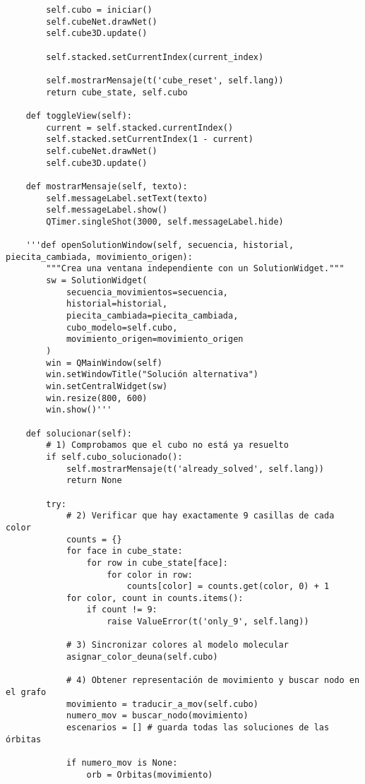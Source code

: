 \begin{lstlisting}
        self.cubo = iniciar()
        self.cubeNet.drawNet()
        self.cube3D.update()
        
        self.stacked.setCurrentIndex(current_index) 

        self.mostrarMensaje(t('cube_reset', self.lang))
        return cube_state, self.cubo

    def toggleView(self):
        current = self.stacked.currentIndex()
        self.stacked.setCurrentIndex(1 - current)
        self.cubeNet.drawNet()
        self.cube3D.update()
    
    def mostrarMensaje(self, texto):
        self.messageLabel.setText(texto)
        self.messageLabel.show()
        QTimer.singleShot(3000, self.messageLabel.hide)
        
    '''def openSolutionWindow(self, secuencia, historial, piecita_cambiada, movimiento_origen):
        """Crea una ventana independiente con un SolutionWidget."""
        sw = SolutionWidget(
            secuencia_movimientos=secuencia,
            historial=historial,
            piecita_cambiada=piecita_cambiada,
            cubo_modelo=self.cubo,
            movimiento_origen=movimiento_origen
        )
        win = QMainWindow(self)
        win.setWindowTitle("Solución alternativa")
        win.setCentralWidget(sw)
        win.resize(800, 600)
        win.show()'''

    def solucionar(self):
        # 1) Comprobamos que el cubo no está ya resuelto
        if self.cubo_solucionado():
            self.mostrarMensaje(t('already_solved', self.lang))
            return None

        try:
            # 2) Verificar que hay exactamente 9 casillas de cada color
            counts = {}
            for face in cube_state:
                for row in cube_state[face]:
                    for color in row:
                        counts[color] = counts.get(color, 0) + 1
            for color, count in counts.items():
                if count != 9:
                    raise ValueError(t('only_9', self.lang))

            # 3) Sincronizar colores al modelo molecular
            asignar_color_deuna(self.cubo)

            # 4) Obtener representación de movimiento y buscar nodo en el grafo
            movimiento = traducir_a_mov(self.cubo)
            numero_mov = buscar_nodo(movimiento)
            escenarios = [] # guarda todas las soluciones de las órbitas

            if numero_mov is None:
                orb = Orbitas(movimiento)
                

\end{lstlisting}

